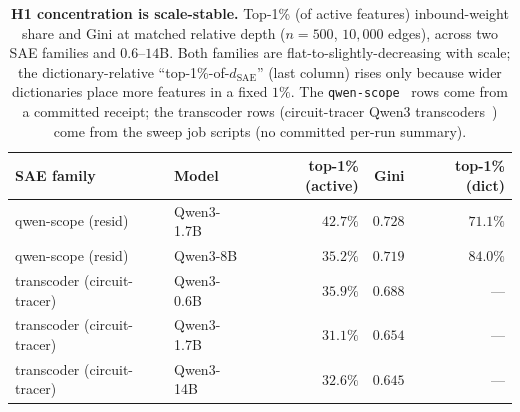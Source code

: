 \documentclass{article}
\begin{document}
\begin{table}[h]
\centering
\caption{\textbf{H1 concentration is scale-stable.} Top-1\% (of active features) inbound-weight share and Gini at matched relative depth ($n{=}500$, $10{,}000$ edges), across two SAE families and $0.6$--$14$B. Both families are flat-to-slightly-decreasing with scale; the dictionary-relative ``top-1\%-of-$d_{\text{SAE}}$'' (last column) rises only because wider dictionaries place more features in a fixed $1\%$. The \texttt{qwen-scope}~\citep{deng2026qwenscope} rows come from a committed receipt; the transcoder rows (circuit-tracer Qwen3 transcoders~\citep{hanna2025circuittracer}) come from the sweep job scripts (no committed per-run summary).}
\label{tab:h1_scale}
\small
\begin{tabular}{llrrr}
\toprule
SAE family & Model & top-1\% (active) & Gini & top-1\% (dict) \\
\midrule
qwen-scope (resid)   & Qwen3-1.7B & $42.7\%$ & $0.728$ & $71.1\%$ \\
qwen-scope (resid)   & Qwen3-8B   & $35.2\%$ & $0.719$ & $84.0\%$ \\
transcoder (circuit-tracer) & Qwen3-0.6B & $35.9\%$ & $0.688$ & --- \\
transcoder (circuit-tracer) & Qwen3-1.7B & $31.1\%$ & $0.654$ & --- \\
transcoder (circuit-tracer) & Qwen3-14B  & $32.6\%$ & $0.645$ & --- \\
\bottomrule
\end{tabular}
\end{table}
\end{document}
